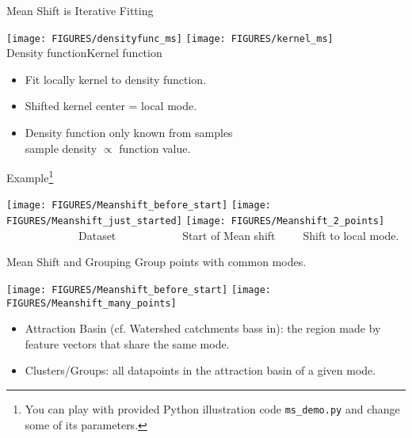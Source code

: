 \documentclass[9pt]{beamer}
\begin{document}
\begin{frame}{Mean Shift is Iterative Fitting}
  \begin{center}
    \texttt{[image: FIGURES/densityfunc\_ms]}\hfill
    \texttt{[image: FIGURES/kernel\_ms]}\hfill\\
    Density function\hfill Kernel function
  \end{center}
  \begin{itemize}
  \item Fit locally kernel to density function.
  \item Shifted kernel center = local mode.
  \item Density function only known from samples\\sample density $\propto$ function value.
  \end{itemize}
\end{frame}


\begin{frame}{Example\footnote{You can play with provided Python illustration code \texttt{ms\_demo.py} and change some of its parameters.}}
  \begin{center}
    \texttt{[image: FIGURES/Meanshift\_before\_start]}\hfill
    \texttt{[image: FIGURES/Meanshift\_just\_started]}\hfill
    \texttt{[image: FIGURES/Meanshift\_2\_points]}\\
    ~~~~~~~~~~~~~Dataset~~~~~\hfill ~~~~~~~Start of Mean shift~~~~~\hfill Shift to local mode.
  \end{center}
\end{frame}

\begin{frame}{Mean Shift and Grouping}
  Group points with common modes.
 \begin{center}
    \texttt{[image: FIGURES/Meanshift\_before\_start]}\hfill
    \texttt{[image: FIGURES/Meanshift\_many\_points]}\\
  \end{center}
  \begin{itemize}
  \item   Attraction Basin (cf. Watershed catchments bass in): the region made
  by feature vectors that share the same mode.
\item Clusters/Groups: all datapoints in the attraction basin of a
  given mode.
  \end{itemize}
\end{frame}
\end{document}

